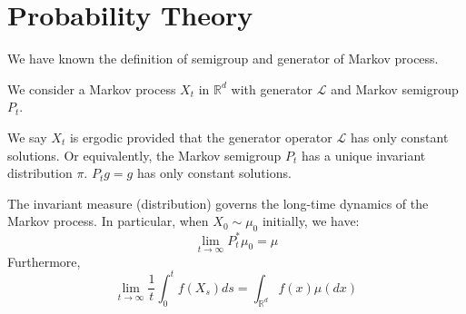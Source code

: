 \newpage
\appendix
\section{Probability Theory}
We have known the definition of semigroup and generator of Markov process.

We consider a Markov process $X_t$ in $\mathbb{R}^d$ with generator $\mathcal{L}$ and Markov semigroup $P_t$.
\begin{definition}
    We say $X_t$ is ergodic provided that the generator operator $\mathcal{L}$ has only constant solutions. Or equivalently, the Markov semigroup $P_t$ has a unique invariant distribution $\pi$.
    $P_tg = g$ has only constant solutions.
\end{definition}

The invariant measure (distribution) governs the long-time dynamics of the Markov process. 
In particular, when $X_0\sim \mu_0$ initially, we have:
\begin{equation}
    \lim_{t\to \infty} P^*_t\mu_0 = \mu
\end{equation}
Furthermore, 
\begin{equation}
    \lim_{t\to \infty} \frac{1}{t}\int_0^t f(X_s)ds = \int_{\mathbb{R}^d} f(x)\mu(dx)
\end{equation}



